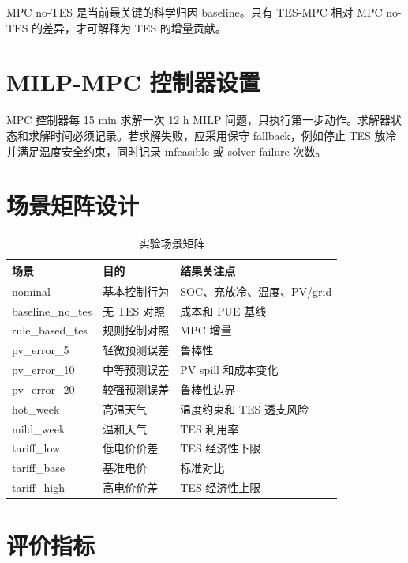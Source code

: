 \documentclass[UTF8,a4paper,12pt]{ctexrep}
\begin{document}
MPC no-TES 是当前最关键的科学归因 baseline。只有 TES-MPC 相对 MPC no-TES 的差异，才可解释为 TES 的增量贡献。

\section{MILP-MPC 控制器设置}

MPC 控制器每 15 min 求解一次 12 h MILP 问题，只执行第一步动作。求解器状态和求解时间必须记录。若求解失败，应采用保守 fallback，例如停止 TES 放冷并满足温度安全约束，同时记录 infeasible 或 solver failure 次数。

\section{场景矩阵设计}

\begin{table}[htbp]
  \centering
  \caption{实验场景矩阵}
  \begin{tabular}{lll}
    \toprule
    场景 & 目的 & 结果关注点 \\
    \midrule
    nominal & 基本控制行为 & SOC、充放冷、温度、PV/grid \\
    baseline\_no\_tes & 无 TES 对照 & 成本和 PUE 基线 \\
    rule\_based\_tes & 规则控制对照 & MPC 增量 \\
    pv\_error\_5 & 轻微预测误差 & 鲁棒性 \\
    pv\_error\_10 & 中等预测误差 & PV spill 和成本变化 \\
    pv\_error\_20 & 较强预测误差 & 鲁棒性边界 \\
    hot\_week & 高温天气 & 温度约束和 TES 透支风险 \\
    mild\_week & 温和天气 & TES 利用率 \\
    tariff\_low & 低电价价差 & TES 经济性下限 \\
    tariff\_base & 基准电价 & 标准对比 \\
    tariff\_high & 高电价价差 & TES 经济性上限 \\
    \bottomrule
  \end{tabular}
\end{table}

\section{评价指标}
\end{document}
